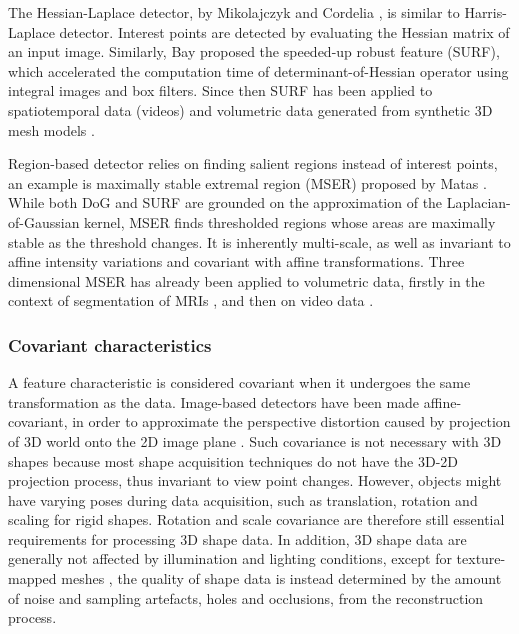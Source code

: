 The Hessian-Laplace detector, by Mikolajczyk and Cordelia \cite{Mikolajczyk2004}, is similar to Harris-Laplace detector. Interest points are detected by evaluating the Hessian matrix of an input image. Similarly, Bay \etal \cite{Bay2008} proposed the speeded-up robust feature (SURF), which accelerated the computation time of determinant-of-Hessian operator using integral images and box filters. Since then SURF has been applied to spatiotemporal data (videos) \cite{Willems2008} and volumetric data generated from synthetic 3D mesh models \cite{Knopp2010}.

Region-based detector relies on finding salient regions instead of interest points, an example is maximally stable extremal region (MSER) proposed by Matas \etal \cite{Matas2004}. 
While both DoG and SURF are grounded on the approximation of the Laplacian-of-Gaussian kernel, MSER finds thresholded regions whose areas are maximally stable as the threshold changes. 
It is inherently multi-scale, as well as invariant to affine intensity variations and covariant with affine transformations. Three dimensional MSER has already been applied to volumetric data, firstly in the context of segmentation of MRIs \cite{Donoser2006}, and then on video data \cite{Riemenschneider2009}.

\subsubsection{Covariant characteristics}

A feature characteristic is considered covariant when it undergoes the same transformation as the data. 
Image-based detectors have been made affine-covariant, in order to approximate the perspective distortion caused by projection of 3D world onto the 2D image plane \cite{Mikolajczyk2002}. 
Such covariance is not necessary with 3D shapes because most shape acquisition techniques do not have the 3D-2D projection process, thus invariant to view point changes. 
However, objects might have varying poses during data acquisition, such as translation, rotation and scaling for rigid shapes. Rotation and scale covariance are therefore still essential requirements for processing 3D shape data. 
In addition, 3D shape data are generally not affected by illumination and lighting conditions, except for texture-mapped meshes \cite{Zaharescu2009}, the quality of shape data is instead determined by the amount of noise and sampling artefacts, \eg holes and occlusions, from the reconstruction process. 

